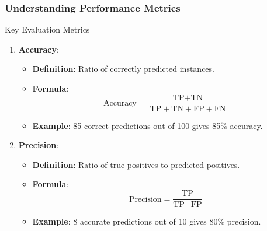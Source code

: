 \documentclass[aspectratio=169]{beamer}
\begin{document}
\begin{frame}[fragile]
    \frametitle{Understanding Performance Metrics}
    \begin{block}{Key Evaluation Metrics}
        \begin{enumerate}
            \item \textbf{Accuracy}:
                \begin{itemize}
                    \item \textbf{Definition}: Ratio of correctly predicted instances.
                    \item \textbf{Formula}:
                        \begin{equation}
                        \text{Accuracy} = \frac{\text{TP} + \text{TN}}{\text{TP} + \text{TN} + \text{FP} + \text{FN}}
                        \end{equation}
                    \item \textbf{Example}: 85 correct predictions out of 100 gives 85\% accuracy.
                \end{itemize}
            \item \textbf{Precision}:
                \begin{itemize}
                    \item \textbf{Definition}: Ratio of true positives to predicted positives.
                    \item \textbf{Formula}:
                        \begin{equation}
                        \text{Precision} = \frac{\text{TP}}{\text{TP} + \text{FP}}
                        \end{equation}
                    \item \textbf{Example}: 8 accurate predictions out of 10 gives 80\% precision.
                \end{itemize}
        \end{enumerate}
    \end{block}
\end{frame}
\end{document}

